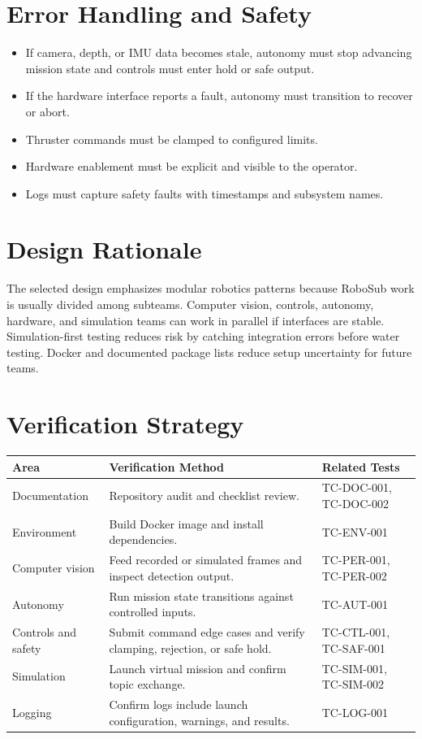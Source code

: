 \documentclass[12pt]{article}
\begin{document}
\section{Error Handling and Safety}
\begin{itemize}[leftmargin=*]
  \item If camera, depth, or IMU data becomes stale, autonomy must stop advancing mission state and controls must enter hold or safe output.
  \item If the hardware interface reports a fault, autonomy must transition to recover or abort.
  \item Thruster commands must be clamped to configured limits.
  \item Hardware enablement must be explicit and visible to the operator.
  \item Logs must capture safety faults with timestamps and subsystem names.
\end{itemize}

\section{Design Rationale}
The selected design emphasizes modular robotics patterns because RoboSub work is usually divided among subteams. Computer vision, controls, autonomy, hardware, and simulation teams can work in parallel if interfaces are stable. Simulation-first testing reduces risk by catching integration errors before water testing. Docker and documented package lists reduce setup uncertainty for future teams.

\section{Verification Strategy}
\begin{longtable}{|p{}|p{}|p{}|}
\hline
\textbf{Area} & \textbf{Verification Method} & \textbf{Related Tests} \\
\hline
Documentation & Repository audit and checklist review. & TC-DOC-001, TC-DOC-002 \\
\hline
Environment & Build Docker image and install dependencies. & TC-ENV-001 \\
\hline
Computer vision & Feed recorded or simulated frames and inspect detection output. & TC-PER-001, TC-PER-002 \\
\hline
Autonomy & Run mission state transitions against controlled inputs. & TC-AUT-001 \\
\hline
Controls and safety & Submit command edge cases and verify clamping, rejection, or safe hold. & TC-CTL-001, TC-SAF-001 \\
\hline
Simulation & Launch virtual mission and confirm topic exchange. & TC-SIM-001, TC-SIM-002 \\
\hline
Logging & Confirm logs include launch configuration, warnings, and results. & TC-LOG-001 \\
\hline
\end{longtable}
\end{document}
